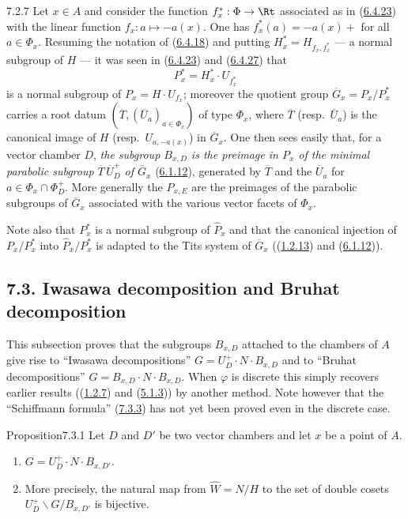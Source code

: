 \documentclass[12pt,a4paper,oneside,english]{smfart}
\makeatletter
\newcommand{\btanchor}[1]{\leavevmode\Hy@raisedlink{\hypertarget{bt:#1}{}}}
\newcommand{\btref}[1]{\hyperlink{bt:#1}{#1}}
\newcommand{\btsecB}[2]{%
  \par\needspace{4\baselineskip}\phantomsection
  \subsection*{#2}%
  \ifx\relax#1\relax\else\btanchor{#1}\fi}
\theoremstyle{definition}
\theoremstyle{bt}
\makeatother
\begin{document}
\begin{btpar}{7.2.7}
Let $x\in A$ and consider the function $f^{*}_{x}:\Phi\to\Rt$ associated
as in (\btref{6.4.23}) with the linear function $f_x:a\mapsto-a(x)$. One has
$f^{*}_{x}(a)=-a(x)+$ for all $a\in\Phi_x$. Resuming the notation of
(\btref{6.4.18}) and putting $H^{*}_{x}=H_{f_x,f^{*}_{x}}$ --- a normal subgroup
of $H$ --- it was seen in (\btref{6.4.23}) and (\btref{6.4.27}) that
\[
  P^{*}_{x}=H^{*}_{x}\cdot U_{f^{*}_{x}}
\]
is a normal subgroup of $P_x=H\cdot U_{f_x}$; moreover the quotient group
$\overline{G}_x=P_x/P^{*}_{x}$ carries a root datum
$(\overline{T},(\overline{U}_a)_{a\in\Phi_x})$ of type $\Phi_x$, where
$\overline{T}$ (resp.\ $\overline{U}_a$) is the canonical image of $H$
(resp.\ $U_{a,-a(x)}$) in $\overline{G}_x$. One then sees easily that,
for a vector chamber $D$, \emph{the subgroup $B_{x,D}$ is the preimage in
$P_x$ of the minimal parabolic subgroup
$\overline{T}\,\overline{U}^{+}_{D}$ of $\overline{G}_x$} (\btref{6.1.12}),
generated by $\overline{T}$ and the $\overline{U}_a$ for
$a\in\Phi_x\cap\Phi^{+}_{D}$. More generally the $P_{x,E}$ are the
preimages of the parabolic subgroups of $\overline{G}_x$ associated with
the various vector facets of $\Phi_x$.

Note also that $P^{*}_{x}$ is a normal subgroup of $\widehat{P}_x$ and
that the canonical injection of $P_x/P^{*}_{x}$ into
$\widehat{P}_x/P^{*}_{x}$ is adapted to the Tits system of
$\overline{G}_x$ ((\btref{1.2.13}) and (\btref{6.1.12})).
\end{btpar}


\btsecB{7.3}{7.3. Iwasawa decomposition and Bruhat decomposition}


\noindent
This subsection proves that the subgroups $B_{x,D}$ attached to the
chambers of $A$ give rise to ``Iwasawa decompositions''
$G=U^{+}_{D}\cdot N\cdot B_{x,D}$ and to ``Bruhat decompositions''
$G=B_{x,D}\cdot N\cdot B_{x,D}$. When $\varphi$ is discrete this simply
recovers earlier results ((\btref{1.2.7}) and (\btref{5.1.3})) by another method. Note
however that the ``Schiffmann formula'' (\btref{7.3.3}) has not yet been proved
even in the discrete case.

\begin{bt}{Proposition}{7.3.1}\btanchor{7.3.1}
Let $D$ and $D'$ be two vector chambers and let $x$ be a point of $A$.
\begin{enumerate}
\item[(i)] $G=U^{+}_{D}\cdot N\cdot B_{x,D'}$.
\item[(ii)] More precisely, the natural map from $\widehat{W}=N/H$ to the
  set of double cosets $U^{+}_{D}\backslash G/B_{x,D'}$ is bijective.
\end{enumerate}
\end{bt}
\end{document}
